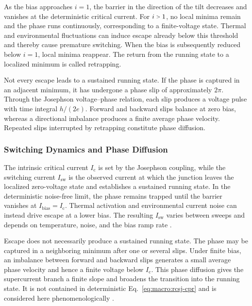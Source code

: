             As the bias approaches $i=1$, the barrier in the direction of the tilt decreases and vanishes at the deterministic critical current. For $i\sgt{}1$, no local minima remain and the phase runs continuously, corresponding to a finite-voltage state. Thermal and environmental fluctuations can induce escape already below this threshold and thereby cause premature switching. When the bias is subsequently reduced below $i=1$, local minima reappear. The return from the running state to a localized minimum is called retrapping.

            Not every escape leads to a sustained running state. If the phase is captured in an adjacent minimum, it has undergone a phase slip of approximately $2\pi$. Through the Josephson voltage--phase relation, each slip produces a voltage pulse with time integral $h/(2e)$. Forward and backward slips balance at zero bias, whereas a directional imbalance produces a finite average phase velocity. Repeated slips interrupted by retrapping constitute phase diffusion.

        \subsubsection*{Switching Dynamics and Phase Diffusion}

            The intrinsic critical current $I_\mathrm{c}$ is set by the Josephson coupling, while the switching current $I_\mathrm{sw}$ is the observed current at which the junction leaves the localized zero-voltage state and establishes a sustained running state. In the deterministic noise-free limit, the phase remains trapped until the barrier vanishes at $I_\mathrm{bias}=I_\mathrm{c}$. Thermal activation and environmental current noise can instead drive escape at a lower bias. The resulting $I_\mathrm{sw}$ varies between sweeps and depends on temperature, noise, and the bias ramp rate \cite{barone_physics_1982,tinkham_introduction_2004}.

            Escape does not necessarily produce a sustained running state. The phase may be captured in a neighboring minimum after one or several slips. Under finite bias, an imbalance between forward and backward slips generates a small average phase velocity and hence a finite voltage below $I_\mathrm{c}$. This phase diffusion gives the supercurrent branch a finite slope and broadens the transition into the running state. It is not contained in deterministic Eq.~\eqref{eq:macro:rcsj-cpr} and is considered here phenomenologically \cite{duprat_phase_2005,barone_physics_1982,tinkham_introduction_2004}.

